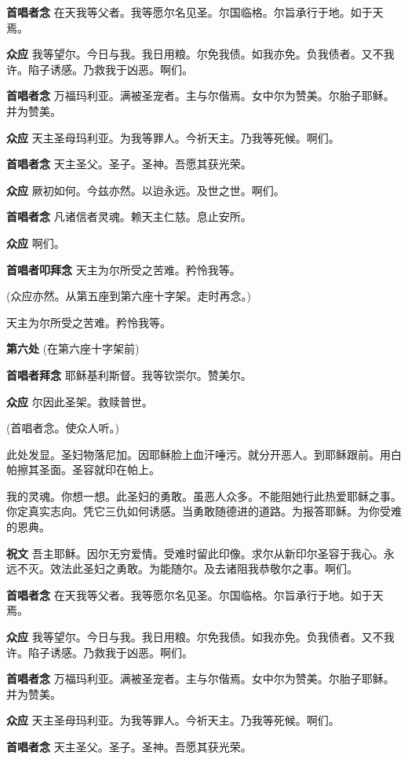 \documentclass[UTF8,17pt]{ctexart}
\begin{document}
\textbf{⾸唱者念} \quad 在天我等⽗者。我等愿尔名见圣。尔国临格。尔旨承⾏于地。如于天焉。

\textbf{众应} \quad 我等望尔。今⽇与我。我⽇⽤粮。尔免我债。如我亦免。负我债者。又不我许。陷⼦诱感。乃救我于凶恶。啊们。

\textbf{⾸唱者念} \quad 万福玛利亚。满被圣宠者。主与尔偕焉。⼥中尔为赞美。尔胎⼦耶稣。并为赞美。

\textbf{众应} \quad 天主圣母玛利亚。为我等罪⼈。今祈天主。乃我等死候。啊们。

\textbf{⾸唱者念} \quad 天主圣⽗。圣⼦。圣神。吾愿其获光荣。

\textbf{众应} \quad 厥初如何。今兹亦然。以迨永远。及世之世。啊们。

\textbf{⾸唱者念} \quad 凡诸信者灵魂。赖天主仁慈。息⽌安所。

\textbf{众应} \quad 啊们。


\textbf{⾸唱者叩拜念} \quad 天主为尔所受之苦难。矜怜我等。

(众应亦然。从第五座到第六座⼗字架。⾛时再念。)

天主为尔所受之苦难。矜怜我等。

\textbf{第六处} (在第六座⼗字架前)

\textbf{⾸唱者拜念} \quad 耶稣基利斯督。我等钦崇尔。赞美尔。

\textbf{众应} \quad 尔因此圣架。救赎普世。

(⾸唱者念。使众⼈听。)

此处发显。圣妇物落尼加。因耶稣脸上⾎汗唾污。就分开恶⼈。到耶稣跟前。⽤⽩帕擦其圣⾯。圣容就印在帕上。

我的灵魂。你想⼀想。此圣妇的勇敢。虽恶⼈众多。不能阻她⾏此热爱耶稣之事。你定真实志向。凭它三仇如何诱感。当勇敢随德进的道路。为报答耶稣。为你受难的恩典。

\textbf{祝⽂} \quad 吾主耶稣。因尔⽆穷爱情。受难时留此印像。求尔从新印尔圣容于我⼼。永远不灭。效法此圣妇之勇敢。为能随尔。及去诸阻我恭敬尔之事。啊们。

\textbf{⾸唱者念} \quad 在天我等⽗者。我等愿尔名见圣。尔国临格。尔旨承⾏于地。如于天焉。

\textbf{众应} \quad 我等望尔。今⽇与我。我⽇⽤粮。尔免我债。如我亦免。负我债者。又不我许。陷⼦诱感。乃救我于凶恶。啊们。

\textbf{⾸唱者念} \quad 万福玛利亚。满被圣宠者。主与尔偕焉。⼥中尔为赞美。尔胎⼦耶稣。并为赞美。

\textbf{众应} \quad 天主圣母玛利亚。为我等罪⼈。今祈天主。乃我等死候。啊们。

\textbf{⾸唱者念} \quad 天主圣⽗。圣⼦。圣神。吾愿其获光荣。
\end{document}
